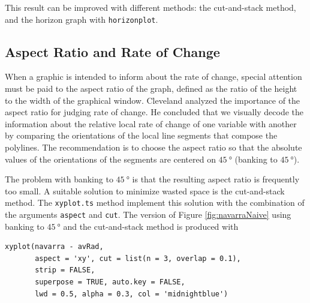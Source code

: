 This result can be improved with different methods: the cut-and-stack
method, and the horizon graph with \texttt{horizonplot}.

\subsection{Aspect Ratio and Rate of Change}
\label{sec:org619307a}
When a graphic is intended to inform about the rate of change,
special attention must be paid to the aspect ratio of the graph,
defined as the ratio of the height to the width of the graphical
window. Cleveland analyzed the importance of the aspect ratio for
judging rate of change. He concluded that we visually decode the
information about the relative local rate of change of one
variable with another by comparing the orientations of the local
line segments that compose the polylines. The recommendation is to
choose the aspect ratio so that the absolute values of the
orientations of the segments are centered on \(\SI{45}{\degree}\) (banking
to \(\SI{45}{\degree}\)). 

The problem with banking to \(\SI{45}{\degree}\) is that the resulting
aspect ratio is frequently too small. A suitable solution to
minimize wasted space is the cut-and-stack method. The \texttt{xyplot.ts}
method implement this solution with the combination of the
arguments \texttt{aspect} and \texttt{cut}. The version of Figure
\ref{fig:navarraNaive} using banking to \(\SI{45}{\degree}\) and the
cut-and-stack method is produced with
\lstset{language=r,label= ,caption= ,captionpos=b,numbers=none}
\begin{lstlisting}
xyplot(navarra - avRad,
       aspect = 'xy', cut = list(n = 3, overlap = 0.1),
       strip = FALSE,
       superpose = TRUE, auto.key = FALSE,
       lwd = 0.5, alpha = 0.3, col = 'midnightblue')
\end{lstlisting}

